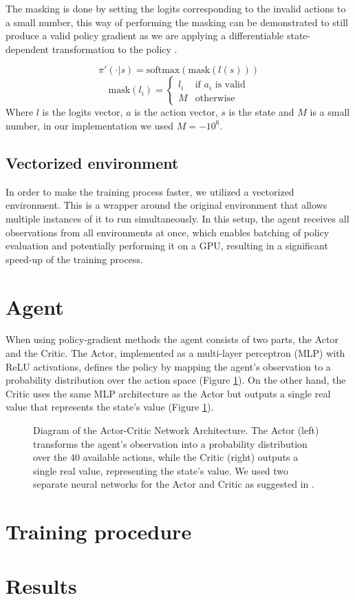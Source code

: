 The masking is done by setting the logits corresponding to the invalid actions to a small number, this way of performing the masking can be demonstrated to still produce a valid policy gradient as we are applying a differentiable state-dependent transformation to the policy \cite{action-masking}.

\begin{equation*}
    \pi'(\cdot|s) = \mathrm{softmax}(\mathrm{mask}(l(s)))
\end{equation*}
\begin{equation*}
    \mathrm{mask}(l_{i}) = \begin{cases}
        l_i & \text{if $a_i$ is valid} \\
        M & \text{otherwise}
    \end{cases}
\end{equation*}
Where $l$ is the logits vector, $a$ is the action vector, $s$ is the state and $M$ is a small number, in our implementation we used $M=-10^6$.

\subsection{Vectorized environment}
In order to make the training process faster, we utilized a vectorized environment. This is a wrapper around the original environment that allows multiple instances of it to run simultaneously. In this setup, the agent receives all observations from all environments at once, which enables batching of policy evaluation and potentially performing it on a GPU, resulting in a significant speed-up of the training process.

\section{Agent}
When using policy-gradient methods the agent consists of two parts, the Actor and the Critic. The Actor, implemented as a multi-layer perceptron (MLP) with ReLU activations, defines the policy by mapping the agent's observation to a probability distribution over the action space (Figure \ref{fig:actor-critic-network}). On the other hand, the Critic uses the same MLP architecture as the Actor but outputs a single real value that represents the state's value (Figure \ref{fig:actor-critic-network}).

\begin{figure}[H]
    \centering
    
    \caption{Diagram of the Actor-Critic Network Architecture. The Actor (left) transforms the agent's observation into a probability distribution over the 40 available actions, while the Critic (right) outputs a single real value, representing the state's value. We used two separate neural networks for the Actor and Critic as suggested in \cite{ppo-implementation-details}.}
    \label{fig:actor-critic-network}
\end{figure}

\section{Training procedure}

\section{Results}